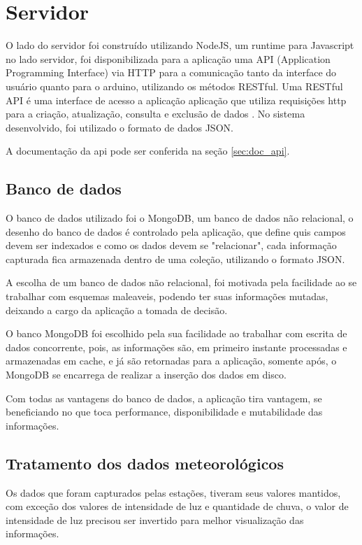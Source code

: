 \section{Servidor}
\label{sec:servidor}

O lado do servidor foi construído utilizando NodeJS, um runtime para Javascript no lado servidor, foi disponibilizada para a aplicação uma API (Application Programming Interface) via HTTP para a comunicação tanto da interface do usuário quanto para o arduino, utilizando os métodos RESTful.
Uma RESTful API é uma interface de acesso a aplicação aplicação que utiliza requisições http para a criação, atualização, consulta e exclusão de dados \cite{restful_api}. No sistema desenvolvido, foi utilizado o formato de dados JSON.

A documentação da api pode ser conferida na seção \ref{sec:doc_api}.

\subsection{Banco de dados}

O banco de dados utilizado foi o MongoDB, um banco de dados não relacional, o desenho do banco de dados é controlado pela aplicação, que define quis campos devem ser indexados e como os dados devem se "relacionar", cada informação capturada fica armazenada dentro de uma coleção, utilizando o formato JSON.

A escolha de um banco de dados não relacional, foi motivada pela facilidade ao se trabalhar com esquemas maleaveis, podendo ter suas informações mutadas, deixando a cargo da aplicação a tomada de decisão.

O banco MongoDB foi escolhido pela sua facilidade ao trabalhar com escrita de dados concorrente, pois, as informações são, em primeiro instante processadas e armazenadas em cache, e já são retornadas para a aplicação, somente após, o MongoDB se encarrega de realizar a inserção dos dados em disco.

Com todas as vantagens do banco de dados, a aplicação tira vantagem, se beneficiando no que toca performance, disponibilidade e mutabilidade das informações.

\subsection{Tratamento dos dados meteorológicos}
\label{sec:tratamento_dados}

Os dados que foram capturados pelas estações, tiveram seus valores mantidos, com exceção dos valores de intensidade de luz e quantidade de chuva, o valor de intensidade de luz precisou ser invertido para melhor visualização das informações.

